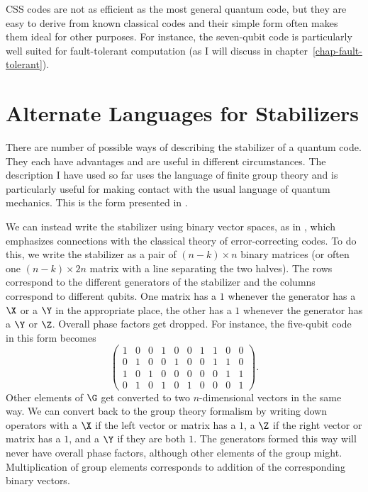 CSS codes are not as efficient as the most general quantum
code, but they are easy to derive from known classical codes and their
simple form often makes them ideal for other purposes.  For instance, the
seven-qubit code is particularly well suited for fault-tolerant computation
(as I will discuss in chapter~\ref{chap-fault-tolerant}).

\section{Alternate Languages for Stabilizers}
\label{sec-alternate}

There are number of possible ways of describing the stabilizer of a
quantum code.   They each have advantages and are useful in different
circumstances.  The description I have used so far uses the language of
finite group theory and is particularly useful for making contact with the
usual language of quantum mechanics.  This is the form presented in
\cite{gottesman-stab}.

We can instead write the stabilizer using binary vector spaces, as in
\cite{calderbank-stab}, which emphasizes connections with the classical
theory of error-correcting codes.  To do this, we write the stabilizer as a
pair of $(n-k) \times n$ binary matrices (or often one $(n-k) \times 2n$
matrix with a line separating the two halves).  The rows correspond to the
different generators of the stabilizer and the columns correspond to
different qubits.  One matrix has a $1$ whenever the generator has a $\X$
or a $\Y$ in the appropriate place, the other has a $1$ whenever the
generator has a $\Y$ or $\Z$.  Overall phase factors get dropped.  For
instance, the five-qubit code in this form becomes
\begin{equation}
	\left( \begin{array}{ccccc|ccccc}
		       1 & 0 & 0 & 1 & 0 & 0 & 1 & 1 & 0 & 0 \\
		       0 & 1 & 0 & 0 & 1 & 0 & 0 & 1 & 1 & 0 \\
		       1 & 0 & 1 & 0 & 0 & 0 & 0 & 0 & 1 & 1 \\
		       0 & 1 & 0 & 1 & 0 & 1 & 0 & 0 & 0 & 1
	\end{array} \right).
\end{equation}
Other elements of $\G$ get converted to two $n$-dimensional vectors in the
same way.  We can convert back to the group theory formalism by writing
down operators with a $\X$ if the left vector or matrix has a $1$, a $\Z$ if
the right vector or matrix has a $1$, and a $\Y$ if they are both $1$.  The
generators formed this way will never have overall phase factors, although
other elements of the group might.  Multiplication of group elements
corresponds to addition of the corresponding binary vectors.

